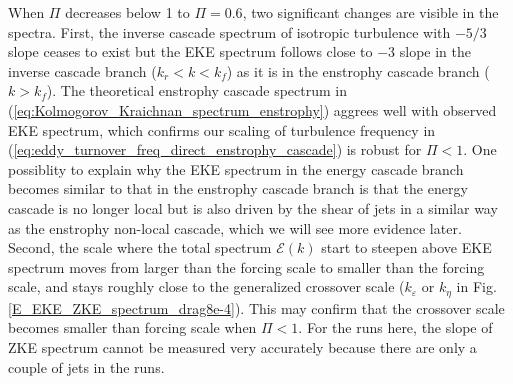 \documentclass{ametsoc}
\begin{document}
When $\Pi$ decreases below 1 to $\Pi=0.6$, two significant changes
are visible in the spectra. First, the inverse cascade spectrum of 
isotropic turbulence with $-5/3$ slope ceases to exist but the EKE
spectrum follows close to $-3$ slope in the inverse cascade branch 
($k_{r}<k<k_{f}$) as it is in the  enstrophy cascade branch ($k>k_{f}$). 
The theoretical enstrophy cascade spectrum in (\ref{eq:Kolmogorov_Kraichnan_spectrum_enstrophy})
aggrees well with observed EKE spectrum, which confirms our scaling of turbulence
frequency in (\ref{eq:eddy_turnover_freq_direct_enstrophy_cascade}) 
is robust for $\Pi<1$. One possiblity to explain why the EKE spectrum 
in the energy cascade branch becomes similar to that in the enstrophy
cascade branch is that the energy cascade is no longer local but is also 
driven by the shear of jets in a similar way as the enstrophy 
non-local cascade, which we will see more evidence later.
Second, the scale where the total spectrum $\mathcal{E}(k)$ start to
steepen above EKE spectrum moves from larger than the forcing scale to
smaller than the forcing scale, and stays roughly close to the generalized
crossover scale ($k_\varepsilon$ or $k_\eta$ in Fig. \ref{E_EKE_ZKE_spectrum_drag8e-4}).
This may confirm that the crossover scale becomes smaller than forcing
scale when $\Pi<1$. For the runs here, the slope of ZKE spectrum
cannot be measured very accurately because there are only a couple of 
jets in the runs.
\end{document}
